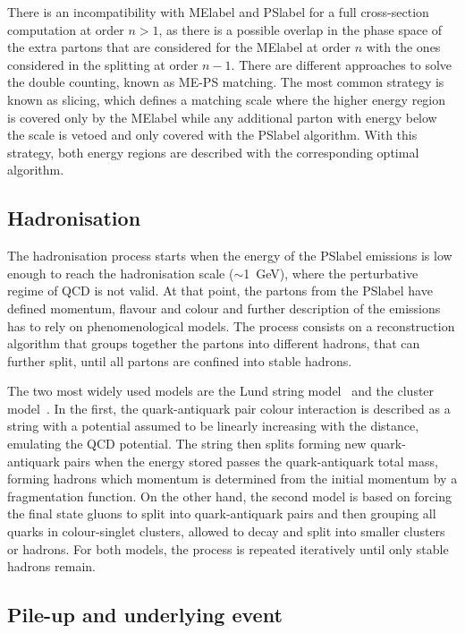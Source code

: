 There is an incompatibility with \acrshort{MElabel} and \acrshort{PSlabel} for a full cross-section computation at order $n>1$, as there is a possible overlap in the phase space of the extra partons that are considered for the \acrshort{MElabel} at order $n$ with the ones considered in the splitting at order $n-1$. There are different approaches to solve the double counting, known as ME-PS matching. The most common strategy is known as slicing, which defines a matching scale where the higher energy region is covered only by the \acrshort{MElabel} while any additional parton with energy below the scale is vetoed and only covered with the \acrshort{PSlabel} algorithm. With this strategy, both energy regions are described with the corresponding optimal algorithm.

\subsection{Hadronisation}

The hadronisation process starts when the energy of the \acrshort{PSlabel} emissions is low enough to reach the hadronisation scale ($\sim$1~GeV), where the perturbative regime of \acrshort{QCD} is not valid. At that point, the partons from the \acrshort{PSlabel} have defined momentum, flavour and colour and further description of the emissions has to rely on phenomenological models. The process consists on a reconstruction algorithm that groups together the partons into different hadrons, that can further split, until all partons are confined into stable hadrons. 

The two most widely used models are the Lund string model~\cite{ANDERSSON198331} and the cluster model~\cite{Winter2004}.
In the first, the quark-antiquark pair colour interaction is described as a string with a potential assumed to be linearly increasing with the distance, emulating the \acrshort{QCD} potential. The string then splits forming new quark-antiquark pairs when the energy stored passes the quark-antiquark total mass, forming hadrons which momentum is determined from the initial momentum by a fragmentation function. On the other hand, the second model is based on forcing the final state gluons to split into quark-antiquark pairs and then grouping all quarks in colour-singlet clusters, allowed to decay and split into smaller clusters or hadrons. For both models, the process is repeated iteratively until only stable hadrons remain.

\subsection{Pile-up and underlying event}

